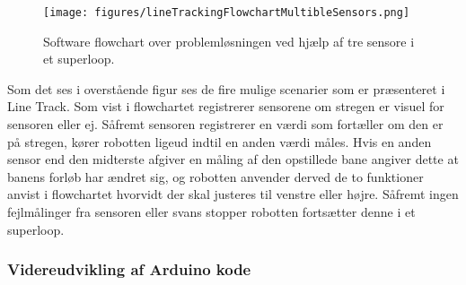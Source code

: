 \begin{figure}[h!]
  \centering
  \texttt{[image: figures/lineTrackingFlowchartMultibleSensors.png]}
  \caption{Software flowchart over problemløsningen ved hjælp af tre sensore i et superloop.}
  \label{init_software}
\end{figure}

Som det ses i overstående figur ses de fire mulige scenarier som er præsenteret i Line Track. 
Som vist i flowchartet registrerer sensorene om stregen er visuel for sensoren eller ej. Såfremt sensoren registrerer en værdi som fortæller om den er på stregen, kører robotten ligeud indtil en anden værdi måles. 
\newline 
Hvis en anden sensor end den midterste afgiver en måling af den opstillede bane angiver dette at banens forløb har ændret sig, og robotten anvender derved de to funktioner anvist i flowchartet hvorvidt der skal justeres til venstre eller højre. 
\newline
Såfremt ingen fejlmålinger fra sensoren eller svans stopper robotten fortsætter denne i et superloop.

\subsubsection{Videreudvikling af Arduino kode}


 

